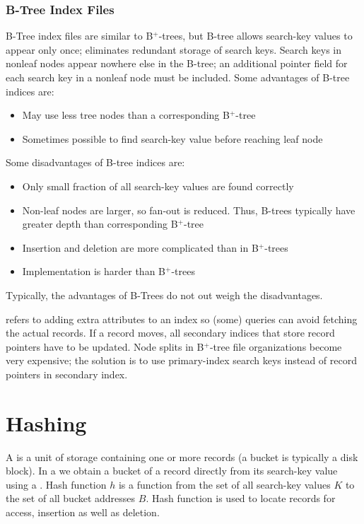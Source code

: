 \documentclass{article}
\begin{document}
\subsubsection{B-Tree Index Files}

B-Tree index files are similar to B$^{+}$-trees, but B-tree allows search-key values to appear only once; eliminates redundant storage of search keys. Search keys in nonleaf nodes appear nowhere else in the B-tree; an additional pointer field for each search key in a nonleaf node must be included. Some advantages of B-tree indices are: 
\begin{itemize}
  \item May use less tree nodes than a corresponding B$^{+}$-tree
  \item Sometimes possible to find search-key value before reaching leaf node 
\end{itemize}
Some disadvantages of B-tree indices are: 
\begin{itemize}
  \item Only small fraction of all search-key values are found correctly
  \item Non-leaf nodes are larger, so fan-out is reduced. Thus, B-trees typically have greater depth than corresponding B$^{+}$-tree 
  \item Insertion and deletion are more complicated than in B$^{+}$-trees 
  \item Implementation is harder than B$^{+}$-trees 
\end{itemize}
Typically, the advantages of B-Trees do not out weigh the disadvantages. 

 refers to adding extra attributes to an index so (some) queries can avoid fetching the actual records. If a record moves, all secondary indices that store record pointers have to be updated. Node splits in B$^{+}$-tree file organizations become very expensive; the solution is to use primary-index search keys instead of record pointers in secondary index. 

\section{Hashing}

A  is a unit of storage containing one or more records (a bucket is typically a disk block). In a  we obtain a bucket of a record directly from its search-key value using a . Hash function $h$ is a function from the set of all search-key values $K$ to the set of all bucket addresses $B$. Hash function is used to locate records for access, insertion as well as deletion. 
\end{document}
